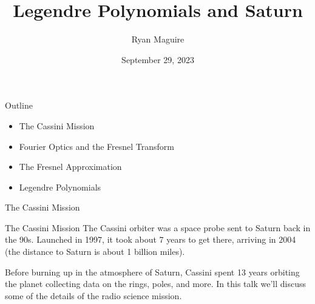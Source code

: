 \documentclass{beamer}
\title{Legendre Polynomials and Saturn}
\author{Ryan Maguire}
\date{September 29, 2023}
\begin{document}
    \maketitle
    \begin{frame}{Outline}
        \begin{itemize}
            \item The Cassini Mission
            \item Fourier Optics and the Fresnel Transform
            \item The Fresnel Approximation
            \item Legendre Polynomials
        \end{itemize}
    \end{frame}
    \begin{frame}{The Cassini Mission}
        \begin{figure}
        \end{figure}
    \end{frame}
    \begin{frame}{The Cassini Mission}
        The Cassini orbiter was a space probe sent to Saturn back in the 90s.
        Launched in 1997, it took about 7 years to get there, arriving in 2004
        (the distance to Saturn is about 1 billion miles).
        \par\hfill\par
        Before burning up in the atmosphere of Saturn, Cassini spent 13 years
        orbiting the planet collecting data on the rings, poles, and more.
        In this talk we'll discuss some of the details of the radio science
        mission.
    \end{frame}
\end{document}

